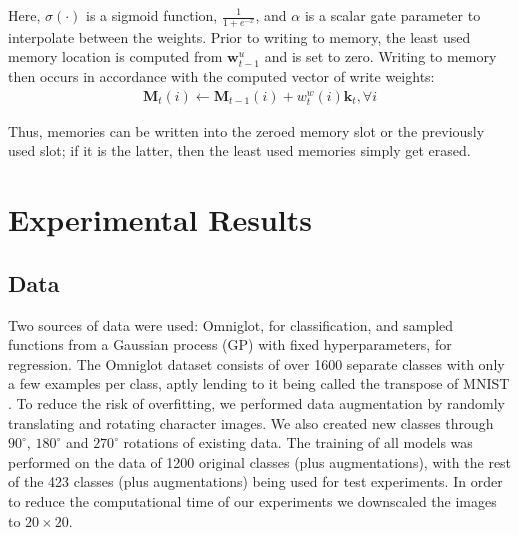 \documentclass{article}
\begin{document}
Here, $\sigma(\cdot)$ is a sigmoid function, $\frac{1}{1+e^{-x}}$, and $\alpha$ is a scalar gate parameter to interpolate between the weights. Prior to writing to memory, the least used memory location is computed from $\mathbf{w}_{t-1}^u$ and is set to zero. Writing to memory then occurs in accordance with the computed vector of write weights:
\begin{align}
    \mathbf{M}_t(i) \leftarrow \mathbf{M}_{t-1}(i) + w_t^{w}(i) \mathbf{k}_{t}, \forall i
\end{align}

Thus, memories can be written into the zeroed memory slot or the previously used slot; if it is the latter, then the least used memories simply get erased. 

\section{Experimental Results}

\subsection{Data}
Two sources of data were used: Omniglot, for classification, and sampled functions from a Gaussian process (GP) with fixed hyperparameters, for regression. The Omniglot dataset consists of over 1600 separate classes with only a few examples per class, aptly lending to it being called the transpose of MNIST \cite{lake2015human}. To reduce the risk of overfitting, we performed data augmentation by randomly translating and rotating character images. We also created new classes through $90^{\circ}$, $180^{\circ}$ and $270^{\circ}$ rotations of existing data. The training of all models was performed on the data of 1200 original classes (plus augmentations), with the rest of the 423 classes (plus augmentations) being used for test experiments. In order to reduce the computational time of our experiments we downscaled the images to $20\times20$.
\end{document}
